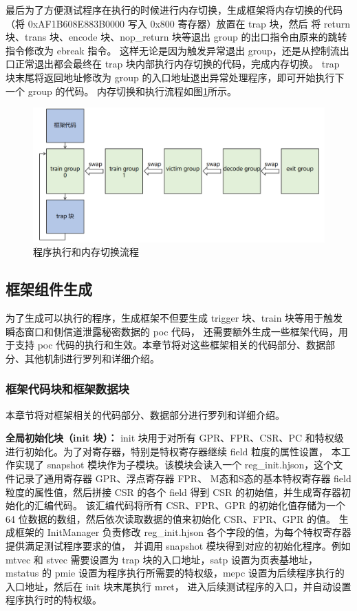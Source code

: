 最后为了方便测试程序在执行的时候进行内存切换，生成框架将内存切换的代码（将 0xAF1B608E883B0000 写入 0x800 寄存器）放置在 trap 块，然后
将 return 块、trans 块、encode 块、nop\_return 块等退出 group 的出口指令由原来的跳转指令修改为 ebreak 指令。
这样无论是因为触发异常退出 group，还是从控制流出口正常退出都会最终在 trap 块内部执行内存切换的代码，完成内存切换。
trap 块末尾将返回地址修改为 group 的入口地址退出异常处理程序，即可开始执行下一个 group 的代码。
内存切换和执行流程如图\ref{paper:execute-flow}所示。\par

\begin{figure}[!h]
    \centering
    \includegraphics[width=\linewidth]{figure/paper/execute-flow.png}
    \caption{程序执行和内存切换流程}
    \label{paper:execute-flow}
\end{figure}

\subsection{框架组件生成}

为了生成可以执行的程序，生成框架不但要生成 trigger 块、train 块等用于触发瞬态窗口和侧信道泄露秘密数据的 poc 代码，
还需要额外生成一些框架代码，用于支持 poc 代码的执行和生效。本章节将对这些框架相关的代码部分、数据部分、其他机制进行罗列和详细介绍。\par

\subsubsection{框架代码块和框架数据块}
本章节将对框架相关的代码部分、数据部分进行罗列和详细介绍。

\textbf{全局初始化块（init 块）：}
init 块用于对所有 GPR、FPR、CSR、PC 和特权级进行初始化。为了对寄存器，特别是特权寄存器继续 field 粒度的属性设置，
本工作实现了 snapshot 模块作为子模块。该模块会读入一个 reg\_init.hjson，这个文件记录了通用寄存器 GPR、浮点寄存器 FPR、
M态和S态的基本特权寄存器 field 粒度的属性值，然后拼接 CSR 的各个 field 得到 CSR 的初始值，并生成寄存器初始化的汇编代码。
该汇编代码将所有 CSR、FPR、GPR 的初始化值存储为一个 64 位数据的数组，然后依次读取数据的值来初始化 CSR、FPR、GPR 的值。
生成框架的 InitManager 负责修改 reg\_init.hjson 各个字段的值，为每个特权寄存器提供满足测试程序要求的值，
并调用 snapshot 模块得到对应的初始化程序。例如 mtvec 和 stvec 需要设置为 trap 块的入口地址，satp 设置为页表基地址，
mstatus 的 pmie 设置为程序执行所需要的特权级，mepc 设置为后续程序执行的入口地址，然后在 init 块末尾执行 mret，
进入后续测试程序的入口，并自动设置程序执行时的特权级。\par

